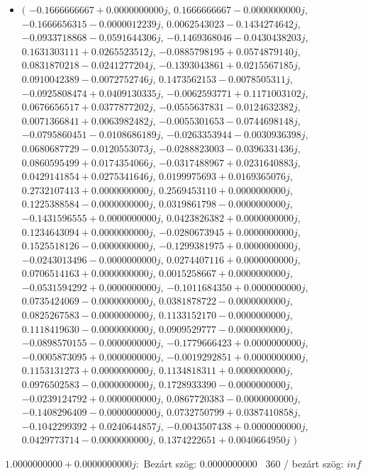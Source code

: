 \documentclass[14pt,a4paper]{article}
\begin{document}
\begin{itemize}
\item
$\big($
$-0.1666666667+0.0000000000j$, $0.1666666667-0.0000000000j$, $-0.1666656315-0.0000012239j$, $0.0062543023-0.1434274642j$, $-0.0933718868-0.0591644306j$, $-0.1469368046-0.0430438203j$, $0.1631303111+0.0265523512j$, $-0.0885798195+0.0574879140j$, $0.0831870218-0.0241277204j$, $-0.1393043861+0.0215567185j$, $0.0910042389-0.0072752746j$, $0.1473562153-0.0078505311j$, $-0.0925808474+0.0409130335j$, $-0.0062593771+0.1171003102j$, $0.0676656517+0.0377877202j$, $-0.0555637831-0.0124632382j$, $0.0071366841+0.0063982482j$, $-0.0055301653-0.0744698148j$, $-0.0795860451-0.0108686189j$, $-0.0263353944-0.0030936398j$, $0.0680687729-0.0120553073j$, $-0.0288823003-0.0396331436j$, $0.0860595499+0.0174354066j$, $-0.0317488967+0.0231640883j$, $0.0429141854+0.0275341646j$, $0.0199975693+0.0169365076j$, $0.2732107413+0.0000000000j$, $0.2569453110+0.0000000000j$, $0.1225388584-0.0000000000j$, $0.0319861798-0.0000000000j$, $-0.1431596555+0.0000000000j$, $0.0423826382+0.0000000000j$, $0.1234643094+0.0000000000j$, $-0.0280673945+0.0000000000j$, $0.1525518126-0.0000000000j$, $-0.1299381975+0.0000000000j$, $-0.0243013496-0.0000000000j$, $0.0274407116+0.0000000000j$, $0.0706514163+0.0000000000j$, $0.0015258667+0.0000000000j$, $-0.0531594292+0.0000000000j$, $-0.1011684350+0.0000000000j$, $0.0735424069-0.0000000000j$, $0.0381878722-0.0000000000j$, $0.0825267583-0.0000000000j$, $0.1133152170-0.0000000000j$, $0.1118419630-0.0000000000j$, $0.0909529777-0.0000000000j$, $-0.0898570155-0.0000000000j$, $-0.1779666423+0.0000000000j$, $-0.0005873095+0.0000000000j$, $-0.0019292851+0.0000000000j$, $0.1153131273+0.0000000000j$, $0.1134818311+0.0000000000j$, $0.0976502583-0.0000000000j$, $0.1728933390-0.0000000000j$, $-0.0239124792+0.0000000000j$, $0.0867720383-0.0000000000j$, $-0.1408296409-0.0000000000j$, $0.0732750799+0.0387410858j$, $-0.1042299392+0.0240644857j$, $-0.0043507438+0.0000000000j$, $0.0429773714-0.0000000000j$, $0.1374222651+0.0040664950j$
$\big)$
\end{itemize}
$1.0000000000+0.0000000000j$:\
Bezárt szög: $0.0000000000$ \
360 / bezárt szög: $inf$\
\end{document}
